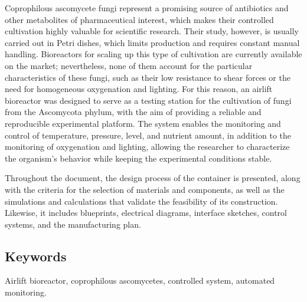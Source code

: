 {Coprophilous ascomycete fungi represent a promising source of antibiotics and other metabolites of pharmaceutical interest, which makes their controlled cultivation highly valuable for scientific research. Their study, however, is usually carried out in Petri dishes, which limits production and requires constant manual handling. Bioreactors for scaling up this type of cultivation are currently available on the market; nevertheless, none of them account for the particular characteristics of these fungi, such as their low resistance to shear forces or the need for homogeneous oxygenation and lighting. For this reason, an airlift bioreactor was designed to serve as a testing station for the cultivation of fungi from the Ascomycota phylum, with the aim of providing a reliable and reproducible experimental platform. The system enables the monitoring and control of temperature, pressure, level, and nutrient amount, in addition to the monitoring of oxygenation and lighting, allowing the researcher to characterize the organism's behavior while keeping the experimental conditions stable.


 Throughout the document, the design process of the container is presented, along with the criteria for the selection of materials and components, as well as the simulations and calculations that validate the feasibility of its construction. Likewise, it includes blueprints, electrical diagrams, interface sketches, control systems, and the manufacturing plan.


\subsection*{Keywords}\label{keywords}

Airlift bioreactor, coprophilous ascomycetes, controlled system, automated monitoring.
}
